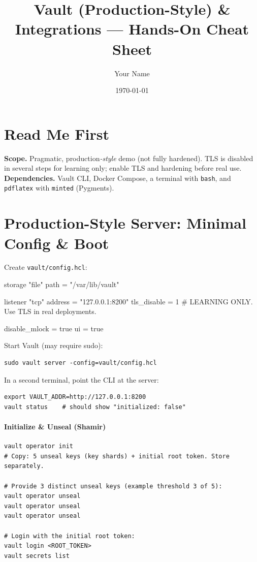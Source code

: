 \documentclass[11pt]{article}
\title{Vault (Production-Style) \& Integrations — Hands-On Cheat Sheet}
\author{Your Name}
\date{\today}
\begin{document}
\maketitle

\section*{Read Me First}
\textbf{Scope.} Pragmatic, production\emph{-style} demo (not fully hardened). TLS is disabled in several steps for learning only; enable TLS and hardening before real use. \\
\textbf{Dependencies.} Vault CLI, Docker Compose, a terminal with \texttt{bash}, and \texttt{pdflatex} with \texttt{minted} (Pygments).

\section{Production-Style Server: Minimal Config \& Boot}
Create \texttt{vault/config.hcl}:
\begin{textcode}
storage "file" {
  path = "/var/lib/vault"
}

listener "tcp" {
  address     = "127.0.0.1:8200"
  tls_disable = 1   # LEARNING ONLY. Use TLS in real deployments.
}

disable_mlock = true
ui            = true
\end{textcode}

Start Vault (may require sudo):
\begin{verbatim}
sudo vault server -config=vault/config.hcl
\end{verbatim}

In a second terminal, point the CLI at the server:
\begin{verbatim}
export VAULT_ADDR=http://127.0.0.1:8200
vault status    # should show "initialized: false"
\end{verbatim}

\paragraph{Initialize \& Unseal (Shamir)}
\begin{verbatim}
vault operator init
# Copy: 5 unseal keys (key shards) + initial root token. Store separately.

# Provide 3 distinct unseal keys (example threshold 3 of 5):
vault operator unseal
vault operator unseal
vault operator unseal

# Login with the initial root token:
vault login <ROOT_TOKEN>
vault secrets list
\end{verbatim}
\end{document}
